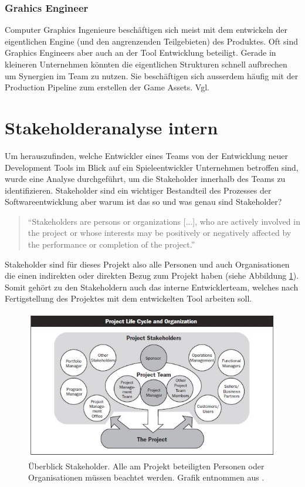 \documentclass[pagesize, paper=a4, fontsize=12pt, titlepage=true, headings=small, headnosepline, abstractoff, liststotoc, nochapterprefix, plainheadsepline, twoside]{scrreprt}
\begin{document}
\subsubsection{Grahics Engineer}
Computer Graphics Ingenieure beschäftigen sich meist mit dem entwickeln der eigentlichen Engine (und den angrenzenden Teilgebieten) des Produktes. Oft sind Graphics Engineers aber auch an der Tool Entwicklung beteiligt. Gerade in kleineren Unternehmen könnten die eigentlichen Strukturen schnell aufbrechen um Synergien im Team zu nutzen. Sie beschäftigen sich ausserdem häufig mit der Production Pipeline zum erstellen der Game Assets. Vgl. \autocite[S. 27 ]{Chandler2006}

\section{Stakeholderanalyse intern}
Um herauszufinden, welche Entwickler eines Teams von der Entwicklung neuer Development Tools im Blick auf ein Spieleentwickler Unternehmen betroffen sind, wurde eine Analyse durchgeführt, um die Stakeholder innerhalb des Teams zu identifizieren. Stakeholder sind ein wichtiger Bestandteil des Prozesses der Softwareentwicklung aber warum ist das so und was genau sind Stakeholder?
\begin{quote}
“Stakeholders are persons or organizations [...], who are actively involved in the project or whose interests may be positively or negatively affected
by the performance or completion of the project.”

\end{quote}
Stakeholder sind für dieses Projekt also alle Personen und auch Organisationen die einen indirekten oder direkten Bezug zum Projekt haben (siehe Abbildung \ref{StakeholderÜbersicht}). Somit gehört zu den Stakeholdern auch das interne Entwicklerteam, welches nach Fertigstellung des Projektes mit dem entwickelten Tool arbeiten soll.

\begin{figure}[ht]
	\centering
	\includegraphics[width=\linewidth]{Bilder/Stakeholder_Uebersicht.jpg}
	\caption{Überblick Stakeholder. Alle am Projekt beteiligten Personen oder Organisationen müssen beachtet werden. Grafik entnommen aus \autocite[S. 24]{PMBOK}.}
	\label{StakeholderÜbersicht}
\end{figure}
\end{document}

